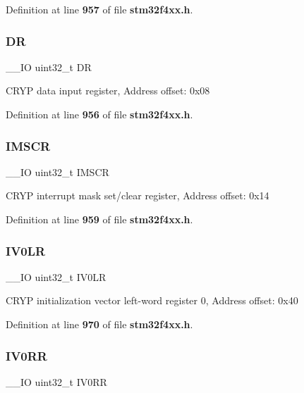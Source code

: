 Definition at line \textbf{ 957} of file \textbf{ stm32f4xx.\+h}.

\mbox{\label{structCRYP__TypeDef_a3df0d8dfcd1ec958659ffe21eb64fa94}} 
\subsubsection{DR}
{\footnotesize\ttfamily \+\_\+\+\_\+\+IO uint32\+\_\+t DR}

C\+R\+YP data input register, Address offset\+: 0x08 

Definition at line \textbf{ 956} of file \textbf{ stm32f4xx.\+h}.

\mbox{\label{structCRYP__TypeDef_adcdd7c23a99f81c21dae2e9f989632e1}} 
\subsubsection{I\+M\+S\+CR}
{\footnotesize\ttfamily \+\_\+\+\_\+\+IO uint32\+\_\+t I\+M\+S\+CR}

C\+R\+YP interrupt mask set/clear register, Address offset\+: 0x14 

Definition at line \textbf{ 959} of file \textbf{ stm32f4xx.\+h}.

\mbox{\label{structCRYP__TypeDef_ab1efba4cdf22c525fce804375961d567}} 
\subsubsection{I\+V0\+LR}
{\footnotesize\ttfamily \+\_\+\+\_\+\+IO uint32\+\_\+t I\+V0\+LR}

C\+R\+YP initialization vector left-\/word register 0, Address offset\+: 0x40 

Definition at line \textbf{ 970} of file \textbf{ stm32f4xx.\+h}.

\mbox{\label{structCRYP__TypeDef_aeb1990f7c28e815a4962db3a861937bb}} 
\subsubsection{I\+V0\+RR}
{\footnotesize\ttfamily \+\_\+\+\_\+\+IO uint32\+\_\+t I\+V0\+RR}

